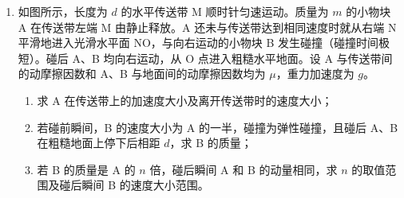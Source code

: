 \documentclass[\gkver]{gaokaozhenti}
\begin{document}
\begin{enumerate}
{解得 $v_{1} = \frac{qBr_{1}}{m} = \frac{2qBh}{m}$

（3）由题意带正电粒子恰好在 M 点产生光点，则关闭磁场时粒子速度恰好指向 M，过 M 点做正电粒子轨迹的切线，切点为 P，如图


根据前面解析可知 $ON = \sqrt{3}h$，所以 $NM = 2\sqrt{3}h$

由于 $O'N = r_{1} = 2h$，且 $O'N \perp NM$

根据几何关系可知 $\angle NO'M = \angle PO'M = 60^\circ$，而 $\angle KO'N = 120^\circ$

所以 $\alpha = 120^\circ$

粒子在磁场中运动的周期 $T = \frac{2\pi m}{qB}$，对应的圆心角 $\alpha = 120^\circ$

所以 $t = \frac{1}{3}T = \frac{1}{3}\cdot\frac{2\pi m}{qB} = \frac{2\pi m}{3qB}$。
}

\item
如图所示，长度为 $d$ 的水平传送带 M 顺时针匀速运动。质量为 $m$ 的小物块 A 在传送带左端 M 由静止释放。A 还未与传送带达到相同速度时就从右端 N 平滑地进入光滑水平面 NO，与向右运动的小物块 B 发生碰撞（碰撞时间极短）。碰后 A、B 均向右运动，从 O 点进入粗糙水平地面。设 A 与传送带间的动摩擦因数和 A、B 与地面间的动摩擦因数均为 $\mu$，重力加速度为 $g$。
\begin{enumerate}
	\item
	求 A 在传送带上的加速度大小及离开传送带时的速度大小；
	\item
	若碰前瞬间，B 的速度大小为 A 的一半，碰撞为弹性碰撞，且碰后 A、B 在粗糙地面上停下后相距 $d$，求 B 的质量；
	\item
	若 B 的质量是 A 的 $n$ 倍，碰后瞬间 A 和 B 的动量相同，求 $n$ 的取值范围及碰后瞬间 B 的速度大小范围。
\end{enumerate}


\end{enumerate}
\end{document}
